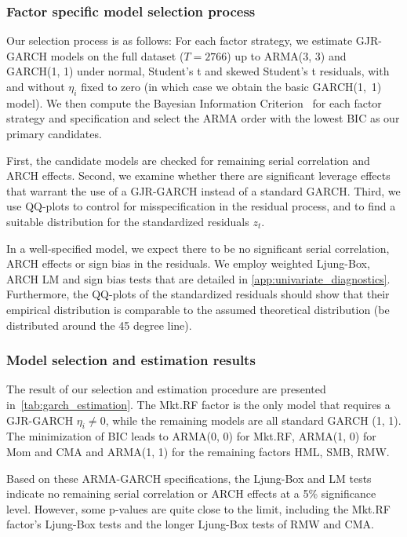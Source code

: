 \subsubsection{Factor specific model selection process}

Our selection process is as follows: For each factor strategy, we estimate GJR-GARCH models on the full dataset ($T = 2766$) up to ARMA(3, 3) and GARCH(1, 1) under normal, Student's t and skewed Student's t residuals, with and without $\eta_i$ fixed to zero (in which case we obtain the basic GARCH(1,~1) model). We then compute the Bayesian Information Criterion~\autocite[BIC]{Schwarz1978} for each factor strategy and specification and select the ARMA order with the lowest BIC as our primary candidates.

First, the candidate models are checked for remaining serial correlation and ARCH effects. Second, we examine whether there are significant leverage effects that warrant the use of a GJR-GARCH instead of a standard GARCH. Third, we use QQ-plots to control for misspecification in the residual process, and to find a suitable distribution for the standardized residuals $z_t$.

In a well-specified model, we expect there to be no significant serial correlation, ARCH effects or sign bias in the residuals. We employ weighted Ljung-Box, ARCH LM and sign bias tests that are detailed in \autoref{app:univariate_diagnostics}. Furthermore, the QQ-plots of the standardized residuals should show that their empirical distribution is comparable to the assumed theoretical distribution (be distributed around the 45 degree line).

\subsubsection{Model selection and estimation results}

The result of our selection and estimation procedure are presented in~\autoref{tab:garch_estimation}. The Mkt.RF factor is the only model that requires a GJR-GARCH $\eta_i \neq 0$, while the remaining models are all standard GARCH (1, 1). The minimization of BIC leads to ARMA(0, 0) for Mkt.RF, ARMA(1, 0) for Mom and CMA and ARMA(1, 1) for the remaining factors HML, SMB, RMW. 



Based on these ARMA-GARCH specifications, the Ljung-Box and LM tests indicate no remaining serial correlation or ARCH effects at a 5\% significance level. However, some p-values are quite close to the limit, including the Mkt.RF factor's Ljung-Box tests and the longer Ljung-Box tests of RMW and CMA.

